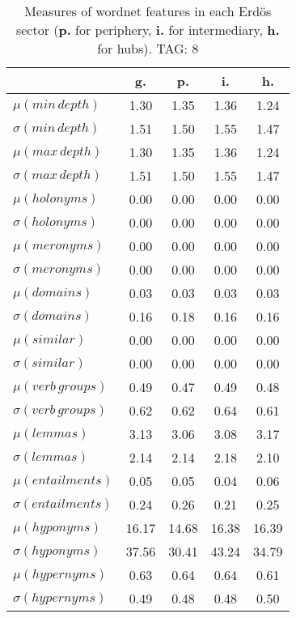 \begin{table}[h!]
\begin{center}
\begin{tabular}{| l | c | c | c | c |}\hline
 & g. & p. & i. & h. \\\hline
$\mu(min\,depth)$ & 1.30  & 1.35  & 1.36  & 1.24 \\\hline
$\sigma(min\,depth)$ & 1.51  & 1.50  & 1.55  & 1.47 \\\hline
$\mu(max\,depth)$ & 1.30  & 1.35  & 1.36  & 1.24 \\\hline
$\sigma(max\,depth)$ & 1.51  & 1.50  & 1.55  & 1.47 \\\hline
$\mu(holonyms)$ & 0.00  & 0.00  & 0.00  & 0.00 \\\hline
$\sigma(holonyms)$ & 0.00  & 0.00  & 0.00  & 0.00 \\\hline
$\mu(meronyms)$ & 0.00  & 0.00  & 0.00  & 0.00 \\\hline
$\sigma(meronyms)$ & 0.00  & 0.00  & 0.00  & 0.00 \\\hline
$\mu(domains)$ & 0.03  & 0.03  & 0.03  & 0.03 \\\hline
$\sigma(domains)$ & 0.16  & 0.18  & 0.16  & 0.16 \\\hline
$\mu(similar)$ & 0.00  & 0.00  & 0.00  & 0.00 \\\hline
$\sigma(similar)$ & 0.00  & 0.00  & 0.00  & 0.00 \\\hline
$\mu(verb\,groups)$ & 0.49  & 0.47  & 0.49  & 0.48 \\\hline
$\sigma(verb\,groups)$ & 0.62  & 0.62  & 0.64  & 0.61 \\\hline
$\mu(lemmas)$ & 3.13  & 3.06  & 3.08  & 3.17 \\\hline
$\sigma(lemmas)$ & 2.14  & 2.14  & 2.18  & 2.10 \\\hline
$\mu(entailments)$ & 0.05  & 0.05  & 0.04  & 0.06 \\\hline
$\sigma(entailments)$ & 0.24  & 0.26  & 0.21  & 0.25 \\\hline
$\mu(hyponyms)$ & 16.17  & 14.68  & 16.38  & 16.39 \\\hline
$\sigma(hyponyms)$ & 37.56  & 30.41  & 43.24  & 34.79 \\\hline
$\mu(hypernyms)$ & 0.63  & 0.64  & 0.64  & 0.61 \\\hline
$\sigma(hypernyms)$ & 0.49  & 0.48  & 0.48  & 0.50 \\\hline
\end{tabular}
\caption{Measures of wordnet features in each Erd\"os sector ({{\bf p.}} for periphery, {{\bf i.}} for intermediary, {{\bf h.}} for hubs). TAG: 8}
\end{center}
\end{table}